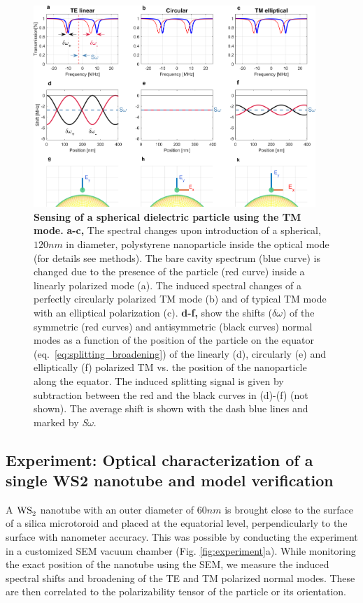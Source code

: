 \documentclass[journal=jacsat,manuscript=article]{achemso}
\begin{document}
\begin{figure}[H]
\centering
                \includegraphics[trim=0.0cm 4.5cm 0.0cm 0.0cm, clip, width=0.95\textwidth]{Images/TMspherical_modified_3.png}\quad
             \caption{\textbf{Sensing of a spherical dielectric particle using the TM mode.} \textbf{a-c,} The spectral changes upon introduction of a spherical, $120nm$ in diameter, polystyrene nanoparticle inside the optical mode (for details see methods). The bare cavity spectrum (blue curve) is changed due to the presence of the particle (red curve) inside a linearly polarized mode (a). The induced spectral changes of a perfectly circularly polarized TM mode (b) and of typical TM mode with an elliptical polarization (c). \textbf{d-f,} show the shifts ($\delta \omega$) of the symmetric (red curves) and antisymmetric (black curves) normal modes as a function of the position of the particle on the equator (eq.~\ref{eq:splitting_broadening}) of the linearly (d), circularly (e) and elliptically (f) polarized TM vs. the position of the nanoparticle along the equator.  The induced splitting signal is given by subtraction between the red and the black curves in (d)-(f) (not shown). The average shift is shown with the dash blue lines and marked by \textit{S}$\omega$.
						\label{fig:TETMcompare}}
\end{figure}

\subsection{Experiment: Optical characterization of a single WS2 nanotube and model verification}

A $\ce{WS_2}$ nanotube with an outer diameter of $60nm$ is brought close to the surface of a silica microtoroid and placed at the equatorial level, perpendicularly to the surface with nanometer accuracy. This was possible by conducting the experiment in a customized SEM vacuum chamber (Fig. \ref{fig:experiment}a).
While monitoring the exact position of the nanotube using the SEM, we measure the induced spectral shifts and broadening of the TE and TM polarized normal modes. These are then correlated to the polarizability tensor of the particle or its orientation.
\end{document}

